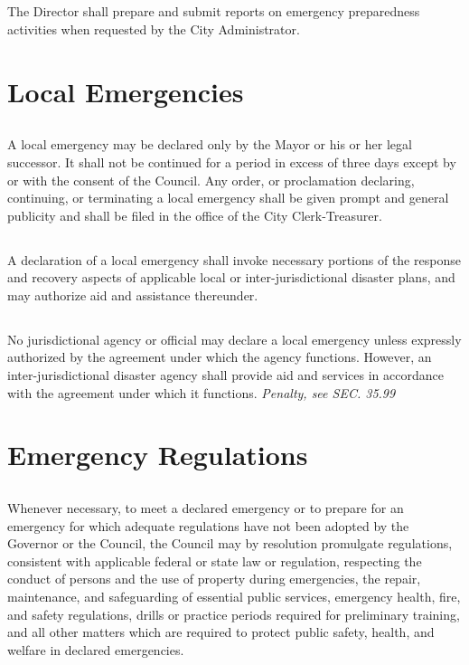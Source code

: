 \documentclass[code.tex]{subfiles}
\begin{document}
\subsection{}
The Director shall prepare and submit reports on emergency preparedness activities when requested by the City Administrator.

\section{Local Emergencies}
\subsection{}
A local emergency may be declared only by the Mayor or his or her legal successor.   It shall not be continued for a period in excess of three days except by or with the consent of the Council. Any order, or proclamation declaring, continuing, or terminating a local emergency shall be given prompt and general publicity and shall be filed in the office of the City Clerk-Treasurer.
\subsection{}
A declaration of a local emergency shall invoke necessary portions of the response and recovery aspects of applicable local or inter-jurisdictional disaster plans, and may authorize aid and assistance thereunder.
\subsection{}
No jurisdictional agency or official may declare a local emergency unless expressly authorized by the agreement under which the agency functions. However, an inter-jurisdictional disaster agency shall provide aid and services in accordance with the agreement under which it functions.\newline
\emph{Penalty, see SEC. 35.99}

\section{Emergency Regulations}
\subsection{}
Whenever necessary, to meet a declared emergency or to prepare for an emergency for which adequate regulations have not been adopted by the Governor or the Council, the Council may by resolution promulgate regulations, consistent with applicable federal or state law or regulation, respecting the conduct of persons and the use of property during emergencies, the repair, maintenance, and safeguarding of essential public services, emergency health, fire, and safety regulations, drills or practice periods required for preliminary training, and all other matters which are required to protect public safety, health, and welfare in declared emergencies.
\end{document}
